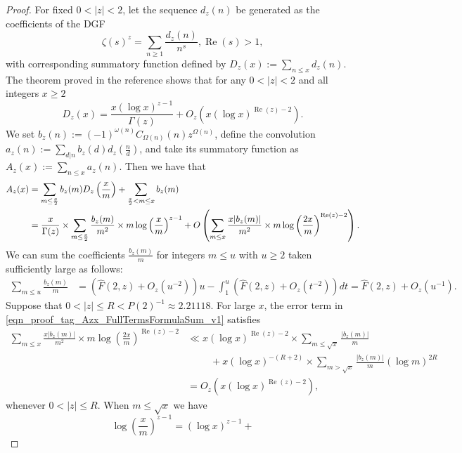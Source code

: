 \documentclass[11pt,reqno,a4letter]{article}
\numberwithin{figure}{section}
\numberwithin{table}{section}
\theoremstyle{plain}
\numberwithin{theorem}{section}
\theoremstyle{definition}
\renewcommand{\Re}{\operatorname{Re}}
\begin{document}
\begin{proof}
For fixed $0 < |z| < 2$, let the sequence $d_z(n)$ be generated as the coefficients of the DGF 
$$\zeta(s)^{z} = \sum_{n \geq 1} \frac{d_z(n)}{n^s}, \Re(s) > 1,$$ with corresponding 
summatory function defined by $D_z(x) := \sum\limits_{n \leq x} d_z(n)$. 
The theorem proved in the reference 
\cite[Thm.\ 7.17; \S 7.4]{MV} shows that for any $0 < |z| < 2$ 
and all integers $x \geq 2$ 
\[
D_z(x) = \frac{x (\log x)^{z-1}}{\Gamma(z)} + O_z\left(x (\log x)^{\Re(z)-2}\right). 
\]
We set 
$b_z(n) := (-1)^{\omega(n)} C_{\Omega(n)}(n) z^{\Omega(n)}$, define the convolution 
$a_z(n) := \sum\limits_{d|n} b_z(d) d_z\left(\frac{n}{d}\right)$, 
and take its summatory function as 
$A_z(x) := \sum\limits_{n \leq x} a_z(n)$. 
Then we have that 
\begin{align} 
\notag 
A_z(x) & = \sum_{m \leq \frac{x}{2}} b_z(m) D_z\left(\frac{x}{m}\right) + 
     \sum_{\frac{x}{2} < m \leq x} b_z(m) \\ 
\label{eqn_proof_tag_Azx_FullTermsFormulaSum_v1} 
     & = \frac{x}{\Gamma(z)} \times \sum_{m \leq \frac{x}{2}} 
     \frac{b_z(m)}{m^2} \times m \log\left(\frac{x}{m}\right)^{z-1} + 
     O\left(\sum_{m \leq x} \frac{x |b_z(m)|}{m^2} \times m 
     \log\left(\frac{2x}{m}\right)^{\Re(z) - 2}\right). 
\end{align} 
We can sum the coefficients $\frac{b_z(m)}{m}$ 
for integers $m \leq u$ with $u \geq 2$ taken sufficiently large as follows: 
\begin{align*} 
\sum_{m \leq u} \frac{b_z(m)}{m} & = \left(\widehat{F}(2, z) + 
     O_z\left(u^{-2}\right)\right) u - \int_1^{u} 
     \left(\widehat{F}(2, z) + O_z\left(t^{-2}\right)\right) dt 
     = \widehat{F}(2, z) + O_z\left(u^{-1}\right). 
\end{align*} 
Suppose that $0 < |z| \leq R < P(2)^{-1} \approx 2.21118$. 
For large $x$, the error term in \eqref{eqn_proof_tag_Azx_FullTermsFormulaSum_v1} satisfies 
\begin{align*} 
\sum_{m \leq x} \frac{x |b_z(m)|}{m^2} \times m 
     \log\left(\frac{2x}{m}\right)^{\Re(z) - 2} & \ll 
     x (\log x)^{\Re(z) - 2} \times \sum_{m \leq \sqrt{x}} \frac{|b_z(m)|}{m} \\ 
     & \phantom{\ll x\ } + 
     x (\log x)^{-(R+2)} \times \sum_{m > \sqrt{x}} \frac{|b_z(m)|}{m} (\log m)^{2R} \\ 
     & = O_z\left(x (\log x)^{\Re(z) - 2}\right), 
\end{align*} 
whenever $0 < |z| \leq R$. 
When $m \leq \sqrt{x}$ we have 
\[
\log\left(\frac{x}{m}\right)^{z-1} = (\log x)^{z-1} + 
\]
\end{proof}
\end{document}
